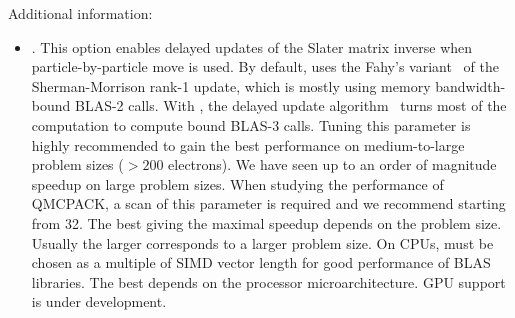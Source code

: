 Additional information:
\begin{itemize}
\item {}. This option enables delayed updates of the Slater matrix inverse when particle-by-particle move is used.
By default,  uses the Fahy's variant~\cite{Fahy1990} of the Sherman-Morrison rank-1 update, which is mostly using memory bandwidth-bound BLAS-2 calls.
With , the delayed update algorithm~\cite{Luo2018delayedupdate,McDaniel2017} turns most of the computation to compute bound BLAS-3 calls.
Tuning this parameter is highly recommended to gain the best performance on medium-to-large problem sizes ($>200$ electrons).
We have seen up to an order of magnitude speedup on large problem sizes.
When studying the performance of QMCPACK, a scan of this parameter is required and we recommend starting from 32.
The best  giving the maximal speedup depends on the problem size.
Usually the larger  corresponds to a larger problem size.
On CPUs,  must be chosen as a multiple of SIMD vector length for good performance of BLAS libraries.
The best  depends on the processor microarchitecture.
GPU support is under development.
\end{itemize}

